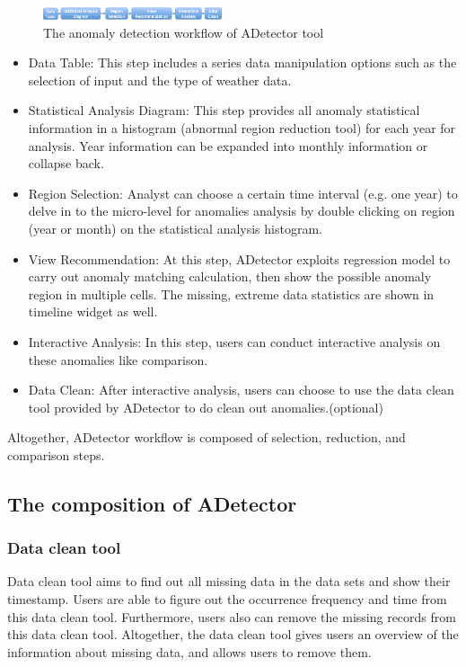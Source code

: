 \documentclass{vgtc}                          %
\begin{document}
\begin{figure}[htb]
	\centering
	\includegraphics[width=0.47\textwidth]{workflow.png}
	\caption{The anomaly detection workflow of ADetector tool}
\end{figure}

\begin{itemize}
	\item Data Table: This step includes a series data manipulation options such as the selection of input and the type of weather data. 
	\item Statistical Analysis Diagram: This step provides all anomaly statistical information in a histogram (abnormal region reduction tool) for each year for analysis. Year information can be expanded into monthly information or collapse back.
	\item Region Selection: Analyst can choose a certain time interval (e.g. one year) to delve in to the micro-level for anomalies analysis by double clicking on region (year or month) on the statistical analysis histogram.
	\item View Recommendation: At this step, ADetector exploits regression model to carry out anomaly matching calculation, then show the possible anomaly region in multiple cells. The missing, extreme data statistics are shown in timeline widget as well.
	\item Interactive Analysis: In this step, users can conduct interactive analysis on these anomalies like comparison.
	\item Data Clean: After interactive analysis, users can choose to use the data clean tool provided by ADetector to do clean out anomalies.(optional)
\end{itemize}
Altogether, ADetector workflow is composed of selection, reduction, and comparison steps.

\subsection{The composition of ADetector}
\subsubsection{Data clean tool}

Data clean tool aims to find out all missing data in the data sets and show their timestamp. Users are able to figure out the occurrence frequency and time from this data clean tool. Furthermore, users also can remove the missing records from this data clean tool. Altogether, the data clean tool gives users an overview of the information about missing data, and allows users to remove them. 
\end{document}
